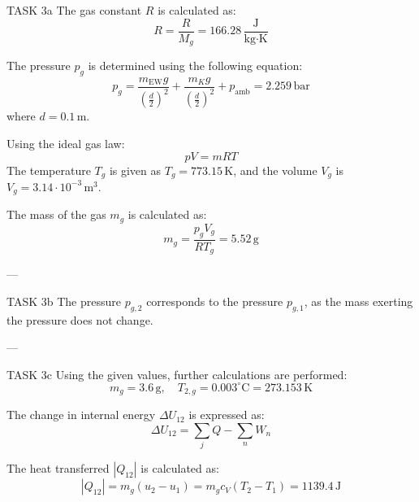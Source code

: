 TASK 3a  
The gas constant \( R \) is calculated as:  
\[
R = \frac{R}{M_g} = 166.28 \, \frac{\text{J}}{\text{kg·K}}
\]  

The pressure \( p_g \) is determined using the following equation:  
\[
p_g = \frac{m_{\text{EW}} g}{\left(\frac{d}{2}\right)^2} + \frac{m_K g}{\left(\frac{d}{2}\right)^2} + p_{\text{amb}} = 2.259 \, \text{bar}
\]  
where \( d = 0.1 \, \text{m} \).  

Using the ideal gas law:  
\[
p V = m R T
\]  
The temperature \( T_g \) is given as \( T_g = 773.15 \, \text{K} \), and the volume \( V_g \) is \( V_g = 3.14 \cdot 10^{-3} \, \text{m}^3 \).  

The mass of the gas \( m_g \) is calculated as:  
\[
m_g = \frac{p_g V_g}{R T_g} = 5.52 \, \text{g}
\]  

---

TASK 3b  
The pressure \( p_{g,2} \) corresponds to the pressure \( p_{g,1} \), as the mass exerting the pressure does not change.  

---

TASK 3c  
Using the given values, further calculations are performed:  
\[
m_g = 3.6 \, \text{g}, \quad T_{2,g} = 0.003^\circ\text{C} = 273.153 \, \text{K}
\]  

The change in internal energy \( \Delta U_{12} \) is expressed as:  
\[
\Delta U_{12} = \sum_j Q - \sum_n W_n
\]  

The heat transferred \( |Q_{12}| \) is calculated as:  
\[
|Q_{12}| = m_g (u_2 - u_1) = m_g c_V (T_2 - T_1) = 1139.4 \, \text{J}
\]  
